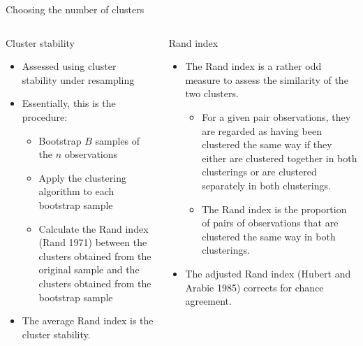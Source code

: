 \documentclass[
  ignorenonframetext,
  aspectratio=169,
]{beamer}
\providecommand{\tightlist}{%
  \setlength{\itemsep}{0pt}\setlength{\parskip}{0pt}}\usepackage{longtable,booktabs,array}
\begin{document}
\begin{frame}{Choosing the number of clusters}
\protect\hypertarget{choosing-the-number-of-clusters}{}
\begin{columns}[T]
\begin{column}{0.5\textwidth}
\begin{block}{Cluster stability}
\protect\hypertarget{cluster-stability}{}
\begin{itemize}
\tightlist
\item
  Assessed using cluster stability under resampling
\item
  Essentially, this is the procedure:

  \begin{itemize}
  \tightlist
  \item
    Bootstrap \(B\) samples of the \(n\) observations
  \item
    Apply the clustering algorithm to each bootstrap sample
  \item
    Calculate the Rand index (Rand 1971) between the clusters obtained
    from the original sample and the clusters obtained from the
    bootstrap sample
  \end{itemize}
\item
  The average Rand index is the cluster stability.
\end{itemize}
\end{block}
\end{column}

\begin{column}{0.5\textwidth}
\begin{block}{Rand index}
\protect\hypertarget{rand-index}{}
\begin{itemize}
\tightlist
\item
  The Rand index is a rather odd measure to assess the similarity of the
  two clusters.

  \begin{itemize}
  \tightlist
  \item
    For a given pair observations, they are regarded as having been
    clustered the same way if they either are clustered together in both
    clusterings or are clustered separately in both clusterings.
  \item
    The Rand index is the proportion of pairs of observations that are
    clustered the same way in both clusterings.
  \end{itemize}
\item
  The adjusted Rand index (Hubert and Arabie 1985) corrects for chance
  agreement.
\end{itemize}
\end{block}
\end{column}
\end{columns}
\end{frame}
\end{document}
